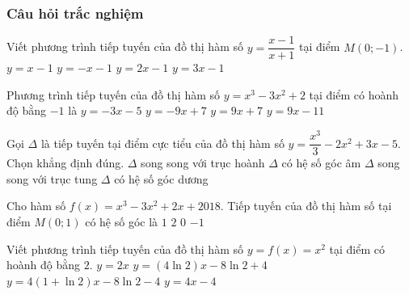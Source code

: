 \subsubsection{Câu hỏi trắc nghiệm}
\begin{ex}%
	Viết phương trình tiếp tuyến của đồ thị hàm số $y=\dfrac{x-1}{x+1}$ tại điểm $M(0;-1)$. 
	\choice
	{$y=x-1$}
	{$y=-x-1$}
	{\True $y=2x-1$}
	{$y=3x-1$}
\end{ex}
\begin{ex}%
	Phương trình tiếp tuyến của đồ thị hàm số $y=x^3-3x^2+2$ tại điểm có hoành độ bằng $-1$ là
	\choice
	{$y=-3x-5$}
	{$y=-9x+7$}
	{\True $y=9x+7$}
	{$y=9x-11$}
\end{ex}
\begin{ex}%
	Gọi $\Delta$ là tiếp tuyến tại điểm cực tiểu của đồ thị hàm số $y=\dfrac{x^3}{3}-2x^2+3x-5$. Chọn khẳng định đúng. 
	\choice
	{\True $\Delta$ song song với trục hoành}
	{$\Delta$ có hệ số góc âm}
	{$\Delta$ song song với trục tung}
	{$\Delta$ có hệ số góc dương}
\end{ex}
\begin{ex}%
	Cho hàm số $f(x)=x^3-3x^2+2x+2018$. Tiếp tuyến của đồ thị hàm số tại điểm $M(0;1)$ có hệ số góc là 
	\choice
	{$1$}
	{\True $2$}
	{$0$}
	{$-1$}
\end{ex}
\begin{ex}%
	Viết phương trình tiếp tuyến của đồ thị hàm số $y=f(x)=x^2$ tại điểm có hoành độ bằng $2$. 
	\choice
	{$y=2x$}
	{$y=(4\ln 2)x-8\ln 2+4$}
	{$y=4(1+\ln 2)x-8\ln 2-4$}
	{\True $y=4x-4$}
\end{ex}
